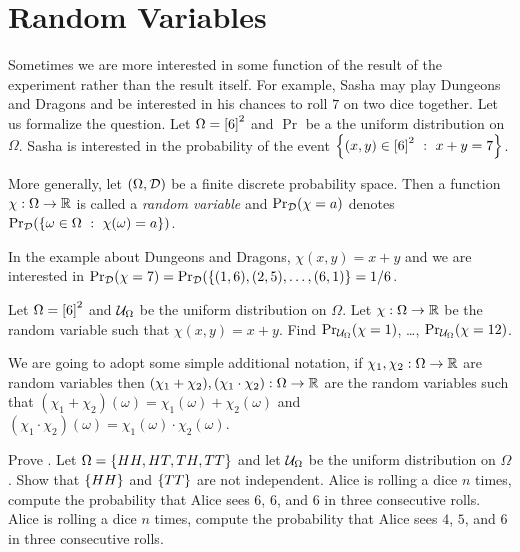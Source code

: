 \section{Random Variables}
Sometimes we are more interested in some function of the result of the
experiment rather than the result itself. For example, Sasha may play Dungeons
and Dragons and be interested in his chances to roll $7$ on two dice together.
Let us formalize the question. Let $\Omega = {[{6}]}^2$ and $\Pr$ be a the
uniform distribution on $\Omega$. Sasha is interested in the probability of the
event $\set[x + y = 7]{(x, y) \in \range{6}^2}$.

More generally, let $(\Omega, \mathcal{D})$ be a finite discrete
probability space. Then a function $\chi : \Omega \to {\mathbb{R}}$ is called a
\emph{random variable} and
$\Pr_{\mathcal{D}}(\chi = a)$ denotes 
$\Pr_{\Distribution{D}}(\set[\chi(\omega) = a]{\omega \in \Omega})$. 

In the example about Dungeons and Dragons, $\chi(x, y) = x + y$ and 
we are interested in $\Pr_{\Distribution{D}}(\chi = 7) = 
\Pr_{\Distribution{D}}(\set{(1, 6), (2, 5), \dots, (6, 1)} = 1 / 6$.
\begin{exercise}
  Let $\Omega = {[{6}]}^2$ and $\mathcal{U}_{\Omega}$ be the uniform distribution
  on $\Omega$. Let $\chi : \Omega \to {\mathbb{R}}$ be the random variable such that 
  $\chi(x, y) = x + y$. Find $\Pr_{\mathcal{U}_{\Omega}}(\chi = 1)$, \dots,
  $\Pr_{\mathcal{U}_{\Omega}}(\chi = 12)$.
\end{exercise}

We are going to adopt some simple additional notation, if 
$\chi_1, \chi_2 : \Omega \to {\mathbb{R}}$ are random variables then 
$(\chi_1 + \chi_2), (\chi_1 \cdot \chi_2) : \Omega \to {\mathbb{R}}$ are the random
variables such that $(\chi_1 + \chi_2)(\omega) = \chi_1(\omega) +
\chi_2(\omega)$ and $(\chi_1 \cdot \chi_2)(\omega) = \chi_1(\omega) \cdot
\chi_2(\omega)$.

\begin{chapterendexercises}
  \exercise Prove .
  \exercise Let $\Omega = \set{HH, HT, TH, TT}$ and let $\mathcal{U}_{\Omega}$ be
    the uniform distribution on $\Omega$. Show that $\set{HH}$ and $\set{TT}$
    are not independent.
  \exercise Alice is rolling a dice $n$ times, compute the probability
    that Alice sees $6$, $6$, and $6$ in three consecutive rolls.
  \exercise Alice is rolling a dice $n$ times, compute the probability
    that Alice sees $4$, $5$, and $6$ in three consecutive rolls.
\end{chapterendexercises}
